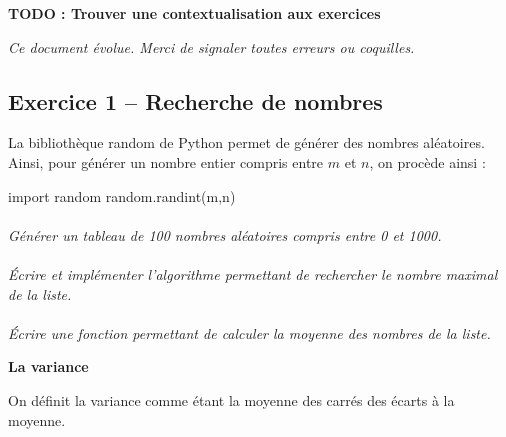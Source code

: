 \documentclass[11pt,oneside]{article}
\begin{document}
\begin{warn}
\textbf{TODO : Trouver une contextualisation aux exercices}
\end{warn}

\setlength{\parskip}{0ex plus 0.2ex minus 0ex}
 \renewcommand{\contentsname}{}
 \renewcommand{\baselinestretch}{1}

\tableofcontents

 \renewcommand{\baselinestretch}{1.2}
\setlength{\parskip}{2ex plus 0.5ex minus 0.2ex}

\textit{Ce document évolue. Merci de signaler toutes erreurs ou coquilles.}


\subsection*{Exercice 1 -- Recherche de nombres}
La bibliothèque \textsf{random} de Python permet de générer des nombres aléatoires. Ainsi, pour générer un nombre entier compris entre $m$ et $n$, on procède ainsi : 

\begin{py}
\begin{python}
import random
random.randint(m,n)
\end{python}
\end{py}

\paragraph{}
\textit{Générer un tableau de 100 nombres aléatoires compris entre 0 et 1000.}

\paragraph{}
\textit{Écrire et implémenter l'algorithme permettant de rechercher le nombre maximal de la liste.}

\paragraph{}
\textit{Écrire une fonction permettant de calculer la moyenne des nombres de la liste.}

\begin{defi}
\textbf{La variance}

On définit la variance comme étant la moyenne des carrés des écarts à la moyenne. 
\end{defi}
\end{document}
